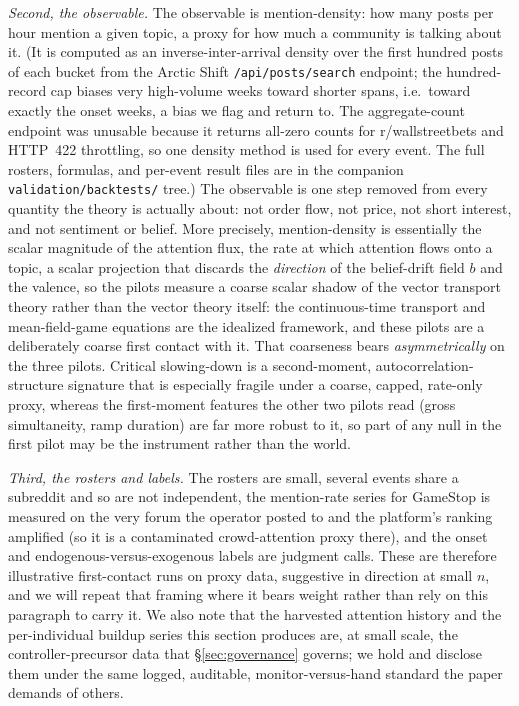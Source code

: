 \documentclass[11pt]{article}
\begin{document}
\emph{Second, the observable.} The observable is mention-density: how many posts per hour mention a given topic, a proxy for how much a community is talking about it. (It is computed as an inverse-inter-arrival density over the first hundred posts of each bucket from the Arctic Shift \texttt{/api/posts/search} endpoint; the hundred-record cap biases very high-volume weeks toward shorter spans, i.e.\ toward exactly the onset weeks, a bias we flag and return to. The aggregate-count endpoint was unusable because it returns all-zero counts for r/wallstreetbets and HTTP~422 throttling, so one density method is used for every event. The full rosters, formulas, and per-event result files are in the companion \texttt{validation/backtests/} tree.) The observable is one step removed from every quantity the theory is actually about: not order flow, not price, not short interest, and not sentiment or belief. More precisely, mention-density is essentially the scalar magnitude of the attention flux, the rate at which attention flows onto a topic, a scalar projection that discards the \emph{direction} of the belief-drift field $b$ and the valence, so the pilots measure a coarse scalar shadow of the vector transport theory rather than the vector theory itself: the continuous-time transport and mean-field-game equations are the idealized framework, and these pilots are a deliberately coarse first contact with it. That coarseness bears \emph{asymmetrically} on the three pilots. Critical slowing-down is a second-moment, autocorrelation-structure signature that is especially fragile under a coarse, capped, rate-only proxy, whereas the first-moment features the other two pilots read (gross simultaneity, ramp duration) are far more robust to it, so part of any null in the first pilot may be the instrument rather than the world.

\emph{Third, the rosters and labels.} The rosters are small, several events share a subreddit and so are not independent, the mention-rate series for GameStop is measured on the very forum the operator posted to and the platform's ranking amplified (so it is a contaminated crowd-attention proxy there), and the onset and endogenous-versus-exogenous labels are judgment calls. These are therefore illustrative first-contact runs on proxy data, suggestive in direction at small $n$, and we will repeat that framing where it bears weight rather than rely on this paragraph to carry it. We also note that the harvested attention history and the per-individual buildup series this section produces are, at small scale, the controller-precursor data that \S\ref{sec:governance} governs; we hold and disclose them under the same logged, auditable, monitor-versus-hand standard the paper demands of others.
\end{document}
